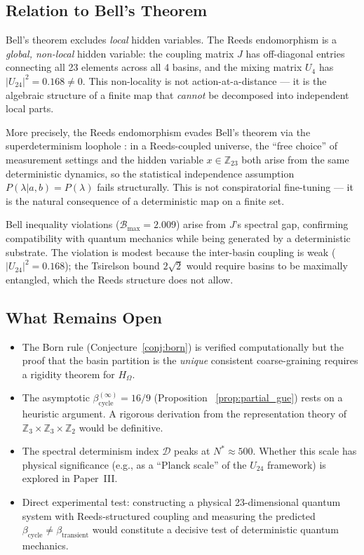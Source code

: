 \documentclass[12pt,a4paper]{article}
\theoremstyle{definition}
\theoremstyle{remark}
\newcommand{\Zp}{\mathbb{Z}_{23}}
\newcommand{\Umix}{U_4}
\newcommand{\Jcoup}{J}
\newcommand{\HOmega}{H_\Omega}
\begin{document}
\subsection{Relation to Bell's Theorem}

Bell's theorem \cite{bell1964} excludes \emph{local} hidden variables. The Reeds
endomorphism is a \emph{global, non-local} hidden variable: the coupling matrix
$\Jcoup$ has off-diagonal entries connecting all 23 elements across all 4 basins,
and the mixing matrix $\Umix$ has $|U_{24}|^2 = 0.168 \neq 0$. This non-locality
is not action-at-a-distance --- it is the algebraic structure of a finite map
that \emph{cannot} be decomposed into independent local parts.

More precisely, the Reeds endomorphism evades Bell's theorem via the
superdeterminism loophole \cite{hossenfelder2020}: in a Reeds-coupled universe,
the ``free choice'' of measurement settings and the hidden variable $x \in \Zp$
both arise from the same deterministic dynamics, so the statistical independence
assumption $P(\lambda | a, b) = P(\lambda)$ fails structurally. This is not
conspiratorial fine-tuning --- it is the natural consequence of a deterministic
map on a finite set.

Bell inequality violations ($\mathcal{B}_{\max} = 2.009$) arise from $\Jcoup$'s
spectral gap, confirming compatibility with quantum mechanics while being
generated by a deterministic substrate. The violation is modest because the
inter-basin coupling is weak ($|U_{24}|^2 = 0.168$); the Tsirelson bound
$2\sqrt{2}$ would require basins to be maximally entangled, which the Reeds
structure does not allow.

\subsection{What Remains Open}

\begin{itemize}
  \item The Born rule (Conjecture~\ref{conj:born}) is verified computationally
  but the proof that the basin partition is the \emph{unique} consistent
  coarse-graining requires a rigidity theorem for $\HOmega$.

  \item The asymptotic $\beta_{\text{cycle}}^{(\infty)} = 16/9$ (Proposition~%
  \ref{prop:partial_gue}) rests on a heuristic argument. A rigorous derivation
  from the representation theory of $\mathbb{Z}_3 \times \mathbb{Z}_3 \times
  \mathbb{Z}_2$ would be definitive.

  \item The spectral determinism index $\mathcal{D}$ peaks at $N^* \approx 500$.
  Whether this scale has physical significance (e.g., as a ``Planck scale'' of the
  $U_{24}$ framework) is explored in Paper~III.

  \item Direct experimental test: constructing a physical 23-dimensional quantum
  system with Reeds-structured coupling and measuring the predicted
  $\beta_{\text{cycle}} \neq \beta_{\text{transient}}$ would constitute a
  decisive test of deterministic quantum mechanics.
\end{itemize}
\end{document}
